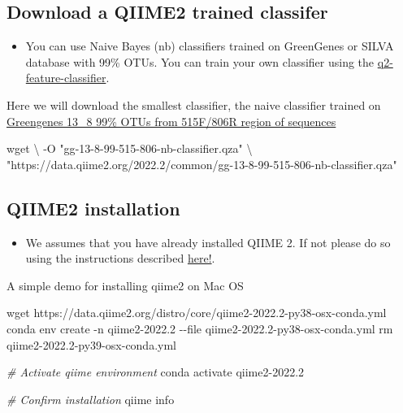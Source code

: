 \documentclass[
  12pt,
  openany]{book}
\newenvironment{Shaded}{\begin{snugshade}}{\end{snugshade}}
\newcommand{\AttributeTok}[1]{\textcolor[rgb]{0.77,0.63,0.00}{#1}}
\newcommand{\CommentTok}[1]{\textcolor[rgb]{0.56,0.35,0.01}{\textit{#1}}}
\newcommand{\DataTypeTok}[1]{\textcolor[rgb]{0.13,0.29,0.53}{#1}}
\newcommand{\ExtensionTok}[1]{#1}
\newcommand{\FunctionTok}[1]{\textcolor[rgb]{0.00,0.00,0.00}{#1}}
\newcommand{\NormalTok}[1]{#1}
\newcommand{\StringTok}[1]{\textcolor[rgb]{0.31,0.60,0.02}{#1}}
\providecommand{\tightlist}{%
  \setlength{\itemsep}{0pt}\setlength{\parskip}{0pt}}
\begin{document}
\hypertarget{download-a-qiime2-trained-classifer}{%
\subsection{Download a QIIME2 trained classifer}\label{download-a-qiime2-trained-classifer}}

\begin{itemize}
\tightlist
\item
  You can use Naive Bayes (nb) classifiers trained on GreenGenes or SILVA database with 99\% OTUs. You can train your own classifier using the \href{https://github.com/qiime2/q2-feature-classifier}{q2-feature-classifier}.
\end{itemize}

Here we will download the smallest classifier, the naive classifier trained on \href{https://docs.qiime2.org/2022.2/data-resources/}{Greengenes 13\_8 99\% OTUs from 515F/806R region of sequences}

\begin{Shaded}
\begin{Highlighting}[]
\FunctionTok{wget} \DataTypeTok{\textbackslash{}}
  \AttributeTok{{-}O} \StringTok{"gg{-}13{-}8{-}99{-}515{-}806{-}nb{-}classifier.qza"} \DataTypeTok{\textbackslash{}}
  \StringTok{"https://data.qiime2.org/2022.2/common/gg{-}13{-}8{-}99{-}515{-}806{-}nb{-}classifier.qza"}
\end{Highlighting}
\end{Shaded}

\hypertarget{qiime2-installation}{%
\subsection{QIIME2 installation}\label{qiime2-installation}}

\begin{itemize}
\tightlist
\item
  We assumes that you have already installed QIIME 2. If not please do so using the instructions described \href{https://docs.qiime2.org/2022.2/install/}{here!}.
\end{itemize}

A simple demo for installing qiime2 on Mac OS

\begin{Shaded}
\begin{Highlighting}[]
\FunctionTok{wget}\NormalTok{ https://data.qiime2.org/distro/core/qiime2{-}2022.2{-}py38{-}osx{-}conda.yml}
\ExtensionTok{conda}\NormalTok{ env create }\AttributeTok{{-}n}\NormalTok{ qiime2{-}2022.2 }\AttributeTok{{-}{-}file}\NormalTok{ qiime2{-}2022.2{-}py38{-}osx{-}conda.yml}
\FunctionTok{rm}\NormalTok{ qiime2{-}2022.2{-}py39{-}osx{-}conda.yml}

\CommentTok{\# Activate qiime environment }
\ExtensionTok{conda}\NormalTok{ activate qiime2{-}2022.2}

\CommentTok{\# Confirm installation}
\ExtensionTok{qiime}\NormalTok{ info}
\end{Highlighting}
\end{Shaded}
\end{document}
